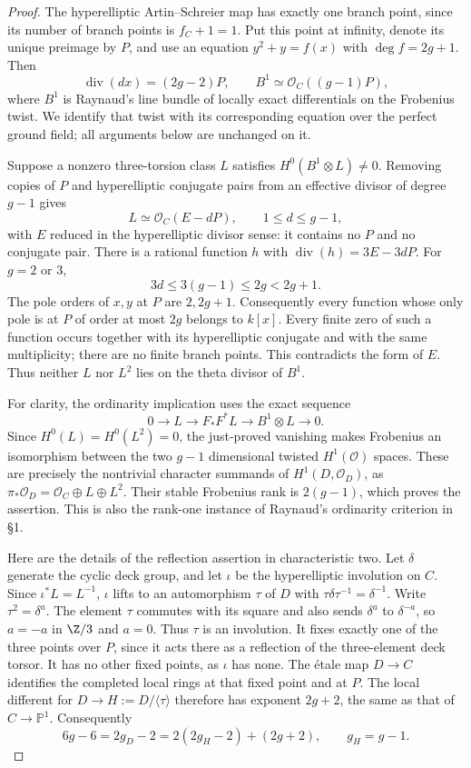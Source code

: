 \begin{proof}
The hyperelliptic Artin--Schreier map has exactly one
branch point, since its number of branch points is
$f_C+1=1$. Put this point at infinity, denote its
unique preimage by $P$, and use an equation
$y^2+y=f(x)$ with $\deg f=2g+1$. Then
\[
 \operatorname{div}(dx)=(2g-2)P,
 \qquad B^1\simeq\mathcal O_C((g-1)P),
\]
where $B^1$ is Raynaud's line bundle of locally exact
differentials on the Frobenius twist. We identify that
twist with its corresponding equation over the perfect
ground field; all arguments below are unchanged on it.

Suppose a nonzero three-torsion class $L$ satisfies
$H^0(B^1\otimes L)\ne0$. Removing copies of $P$ and
hyperelliptic conjugate pairs from an effective divisor
of degree $g-1$ gives
\[
 L\simeq\mathcal O_C(E-dP),\qquad 1\le d\le g-1,
\]
with $E$ reduced in the hyperelliptic divisor sense:
it contains no $P$ and no conjugate pair. There is a
rational function $h$ with
$\operatorname{div}(h)=3E-3dP$. For $g=2$ or $3$,
\[
 3d\le3(g-1)\le2g<2g+1.
\]
The pole orders of $x,y$ at $P$ are $2,2g+1$.
Consequently every function whose only pole is at
$P$ of order at most $2g$ belongs to $k[x]$.
Every finite zero of such a function occurs together
with its hyperelliptic conjugate and with the same
multiplicity; there are no finite branch points.
This contradicts the form of $E$. Thus neither $L$
nor $L^2$ lies on the theta divisor of $B^1$.

For clarity, the ordinarity implication uses the exact
sequence
\[
 0\longrightarrow L\longrightarrow F_*F^*L
   \longrightarrow B^1\otimes L\longrightarrow0.
\]
Since $H^0(L)=H^0(L^2)=0$, the just-proved vanishing
makes Frobenius an isomorphism between the two
$g-1$ dimensional twisted $H^1(\mathcal O)$ spaces.
These are precisely the nontrivial character summands
of $H^1(D,\mathcal O_D)$, as
$\pi_*\mathcal O_D=\mathcal O_C\oplus L\oplus L^2$.
Their stable Frobenius rank is $2(g-1)$, which proves
the assertion. This is also the rank-one instance of
Raynaud's ordinarity criterion in \S1.
\citep[\S1, before Proposition~1]{LA_Raynaud2000}

Here are the details of the reflection assertion in
characteristic two. Let $\delta$ generate the cyclic
deck group, and let $\iota$ be the hyperelliptic
involution on $C$. Since $\iota^*L=L^{-1}$,
$\iota$ lifts to an automorphism $\tau$ of $D$ with
$\tau\delta\tau^{-1}=\delta^{-1}$.
Write $\tau^2=\delta^a$. The element $\tau$ commutes
with its square and also sends $\delta^a$ to
$\delta^{-a}$, so $a=-a$ in $\Z/3$ and $a=0$.
Thus $\tau$ is an involution. It fixes exactly one
of the three points over $P$, since it acts there
as a reflection of the three-element deck torsor.
It has no other fixed points, as $\iota$ has none.
The \'etale map $D\to C$ identifies the completed
local rings at that fixed point and at $P$.
The local different for $D\to H:=D/\langle\tau\rangle$
therefore has exponent $2g+2$, the same as that of
$C\to\mathbb P^1$. Consequently
\[
 6g-6=2g_D-2=2(2g_H-2)+(2g+2),
 \qquad g_H=g-1.
\]


\end{proof}
